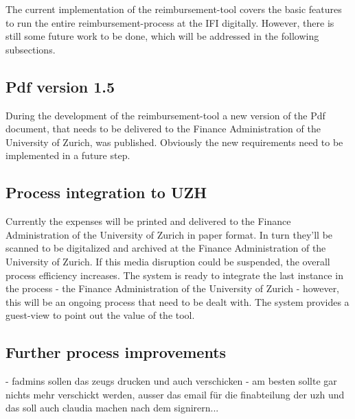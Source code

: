 The current implementation of the reimbursement-tool covers the basic features to run the entire reimbursement-process at the IFI digitally. However, there is still some future work to be done, which will be addressed in the following subsections. 

\subsection{Pdf version 1.5}
During the development of the reimbursement-tool a new version of the Pdf document, that needs to be delivered to the Finance Administration of the University of Zurich, was published. Obviously the new requirements need to be implemented in a future step.

\subsection{Process integration to UZH}
Currently the expenses will be printed and delivered to the Finance Administration of the University of Zurich in paper format. In turn they'll be scanned to be digitalized and archived at the Finance Administration of the University of Zurich. If this media disruption could be suspended, the overall process efficiency increases. The system is ready to integrate the last instance in the process - the Finance Administration of the University of Zurich - however, this will be an ongoing process that need to be dealt with. The system provides a guest-view to point out the value of the tool.


\subsection{Further process improvements}
- fadmins sollen das zeugs drucken und auch verschicken
- am besten sollte gar nichts mehr verschickt werden, ausser das email für die finabteilung der uzh und das soll auch claudia machen nach dem signirern...